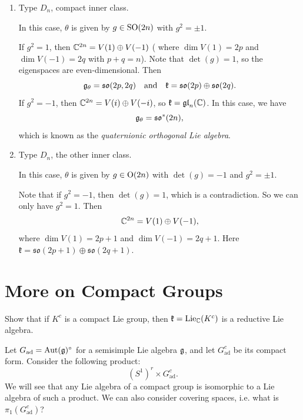 \begin{example}
\begin{enumerate}
      If $g^2 = -1$, then
      $\C^{2n} = V(i) \oplus V(-i)$.
      In this case, $\mathfrak{k} = \mathfrak{gl}_n(\C)$,
      as for any $(w, w) = w \cdot \overline{w}$
      in $\C^n$,
      \[
        \im(w, w)
        = i \im (w \wedge \overline{w})
      \]
      defines a symplectic form
      on $\R^{2n}$. Thus we can view
      $\U(n) \subseteq \Sp_{2n}(\R)$.

    \item Type $D_n$, compact inner class.

      In this case, $\theta$ is given by
      $g \in \operatorname{SO}(2n)$ with $g^2 = \pm 1$.

      If $g^2 = 1$, then
      $\mathbb{C}^{2n} = V(1) \oplus V(-1)$ (
      where $\dim V(1) = 2p$ and $\dim V(-1) = 2q$ with $p + q = n$).
      Note that $\det(g) = 1$, so the
      eigenspaces are even-dimensional.
      Then
      \[
        \mathfrak{g}_\theta
        = \mathfrak{so}(2p, 2q)
        \quad \text{and} \quad
        \mathfrak{k}
        = \mathfrak{so}(2p) \oplus \mathfrak{so}(2q).
      \]
      If $g^2 = -1$, then
      $\C^{2n} = V(i) \oplus V(-i)$,
      so $\mathfrak{k} = \mathfrak{gl}_n(\C)$.
      In this case, we have
      \[
        \mathfrak{g}_\theta = \mathfrak{so}^*(2n),
      \]
      which is known as the
      \emph{quaternionic orthogonal Lie algebra}.
    \item Type $D_n$, the other inner class.

      In this case, $\theta$ is given by
      $g \in \operatorname{O}(2n)$ with
      $\det(g) = -1$ and $g^2 = \pm 1$.

      Note that if $g^2 = -1$, then $\det(g) = 1$,
      which is a contradiction. So
      we can only have $g^2 = 1$. Then
      \[
        \mathbb{C}^{2n} = V(1) \oplus V(-1),
      \]
      where $\dim V(1) = 2p + 1$ and $\dim V(-1) = 2q + 1$.
      Here $\mathfrak{k} = \mathfrak{so}({2p + 1}) \oplus \mathfrak{so}({2q + 1})$.
  \end{enumerate}
\end{example}

\section{More on Compact Groups}

\begin{exercise}
  Show that if $K^c$ is a
  compact Lie group, then
  $\mathfrak{k} = \operatorname{Lie}_{\mathbb{C}}(K^c)$ is a
  reductive Lie algebra.
\end{exercise}

\begin{example}
  Let $G_{\mathrm{ad}} = \operatorname{Aut}(\mathfrak{g})^\circ$
  for a semisimple Lie algebra $\mathfrak{g}$,
  and let $G_{\mathrm{ad}}^c$ be
  its compact form. Consider the
  following product:
  \[
    (S^1)^r \times G_{\mathrm{ad}}^c.
  \]
  We will see that any Lie algebra
  of a compact group is isomorphic to a
  Lie algebra of such a product.
  We can also consider covering spaces,
  i.e. what is $\pi_1(G_{\mathrm{ad}}^c)$?
\end{example}
